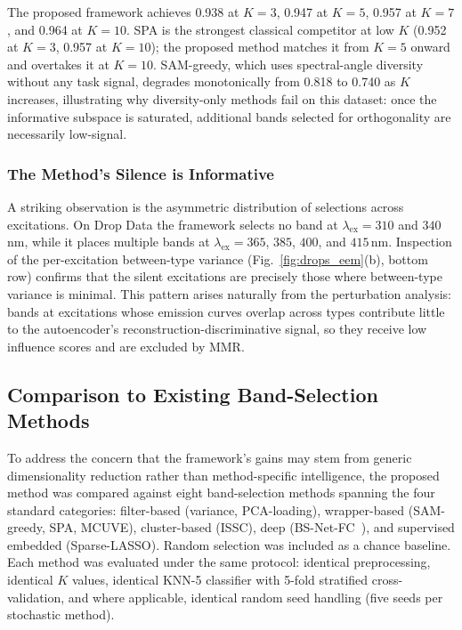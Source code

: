 The proposed framework achieves 0.938 at $K=3$, 0.947 at $K=5$, 0.957 at $K=7$, and 0.964 at $K=10$.
SPA is the strongest classical competitor at low $K$ (0.952 at $K=3$, 0.957 at $K=10$); the proposed method matches it from $K=5$ onward and overtakes it at $K=10$.
SAM-greedy, which uses spectral-angle diversity without any task signal, degrades monotonically from 0.818 to 0.740 as $K$ increases, illustrating why diversity-only methods fail on this dataset: once the informative subspace is saturated, additional bands selected for orthogonality are necessarily low-signal.

\subsubsection{The Method's Silence is Informative}
A striking observation is the asymmetric distribution of selections across excitations.
On Drop Data the framework selects no band at $\lambda_{\text{ex}} = 310$ and $340$\,nm, while it places multiple bands at $\lambda_{\text{ex}} = 365$, $385$, $400$, and $415$\,nm.
Inspection of the per-excitation between-type variance (Fig.~\ref{fig:drops_eem}(b), bottom row) confirms that the silent excitations are precisely those where between-type variance is minimal.
This pattern arises naturally from the perturbation analysis: bands at excitations whose emission curves overlap across types contribute little to the autoencoder's reconstruction-discriminative signal, so they receive low influence scores and are excluded by MMR.

\subsection{Comparison to Existing Band-Selection Methods}
\label{sec:results_sota}

To address the concern that the framework's gains may stem from generic dimensionality reduction rather than method-specific intelligence, the proposed method was compared against eight band-selection methods spanning the four standard categories: filter-based (variance, PCA-loading), wrapper-based (SAM-greedy, SPA, MCUVE), cluster-based (ISSC), deep (BS-Net-FC~\cite{cai2020bsnet}), and supervised embedded (Sparse-LASSO).
Random selection was included as a chance baseline.
Each method was evaluated under the same protocol: identical preprocessing, identical $K$ values, identical KNN-5 classifier with 5-fold stratified cross-validation, and where applicable, identical random seed handling (five seeds per stochastic method).

